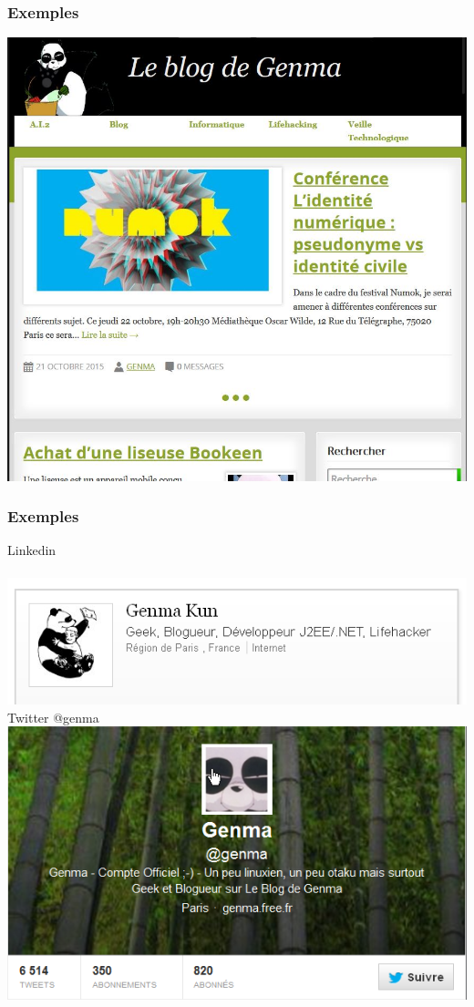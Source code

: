 \documentclass{beamer}
\begin{document}
\begin{frame}
\frametitle{Exemples}
\begin{center}
\includegraphics[scale=0.5] {./images/blog.png} 
\end{center}
\end{frame}

\begin{frame}
\frametitle{Exemples}
\begin{center}
Linkedin\\~\\
\includegraphics[scale=0.4] {./images/Linkedin.png} 
\\
Twitter @genma\\
\includegraphics[scale=0.4] {./images/Twitter.png}
\end{center}
\end{frame}
\end{document}
